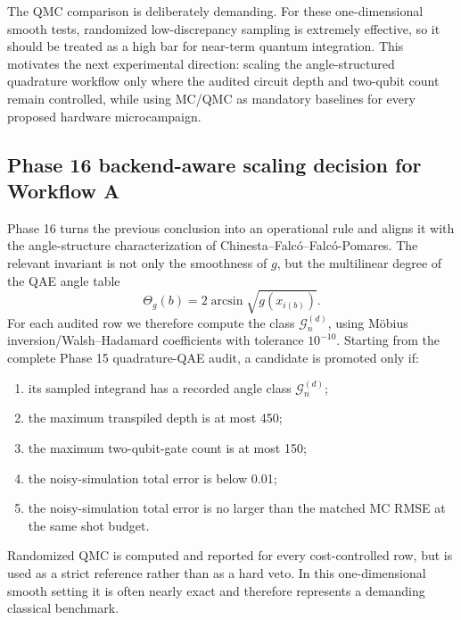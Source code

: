 The QMC comparison is deliberately demanding. For these one-dimensional smooth
tests, randomized low-discrepancy sampling is extremely effective, so it should
be treated as a high bar for near-term quantum integration. This motivates the
next experimental direction: scaling the angle-structured quadrature workflow
only where the audited circuit depth and two-qubit count remain controlled,
while using MC/QMC as mandatory baselines for every proposed hardware
microcampaign.

\subsection{Phase 16 backend-aware scaling decision for Workflow A}
\label{subsec:phase16-angle-scaling}

Phase 16 turns the previous conclusion into an operational rule and aligns it
with the angle-structure characterization of Chinesta--Falcó--Falcó-Pomares.
The relevant invariant is not only the smoothness of \(g\), but the multilinear
degree of the QAE angle table
\[
  \Theta_g(b)=2\arcsin\sqrt{g(x_{i(b)})}.
\]
For each audited row we therefore compute the class
\(\mathcal{G}^{(d)}_n\), using Möbius inversion/Walsh--Hadamard coefficients
with tolerance \(10^{-10}\). Starting from the complete Phase 15
quadrature-QAE audit, a candidate is promoted only if:
\begin{enumerate}[label=(\roman*)]
    \item its sampled integrand has a recorded angle class
          \(\mathcal{G}^{(d)}_n\);
    \item the maximum transpiled depth is at most 450;
    \item the maximum two-qubit-gate count is at most 150;
    \item the noisy-simulation total error is below 0.01;
    \item the noisy-simulation total error is no larger than the matched MC
          RMSE at the same shot budget.
\end{enumerate}
Randomized QMC is computed and reported for every cost-controlled row, but is
used as a strict reference rather than as a hard veto. In this one-dimensional
smooth setting it is often nearly exact and therefore represents a demanding
classical benchmark.

